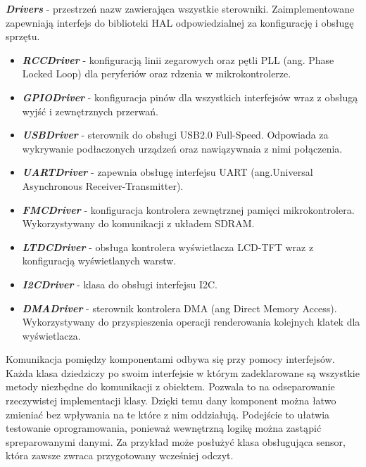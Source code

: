 \documentclass[eng,printmode]{mgr}
\begin{document}
\noindent
\textbf{\textit{Drivers}} - przestrzeń nazw zawierająca wszystkie sterowniki. Zaimplementowane zapewniają interfejs do biblioteki HAL odpowiedzialnej za konfigurację i obsługę sprzętu.
\begin{itemize}[label={}]
  \item \textbf{\textit{RCCDriver}} - konfiguracją linii zegarowych oraz pętli PLL (ang. Phase Locked Loop) dla peryferiów oraz rdzenia w mikrokontrolerze. 
  \item \textbf{\textit{GPIODriver}} - konfiguracja pinów dla wszystkich interfejsów wraz z obsługą wyjść i zewnętrznych przerwań.
  \item \textbf{\textit{USBDriver}} - sterownik do obsługi USB2.0 Full-Speed. Odpowiada za wykrywanie podłaczonych urządzeń oraz nawiązywnaia z nimi połączenia.
  \item \textbf{\textit{UARTDriver}} - zapewnia obsługę interfejsu UART (ang.Universal Asynchronous Receiver-Transmitter).
  \item \textbf{\textit{FMCDriver}} - konfiguracja kontrolera zewnętrznej pamięci mikrokontrolera. Wykorzystywany do komunikacji z układem SDRAM.
  \item \textbf{\textit{LTDCDriver}} - obsługa kontrolera wyświetlacza LCD-TFT wraz z konfiguracją wyświetlanych warstw.  
  \item \textbf{\textit{I2CDriver}} - klasa do obsługi interfejsu I2C.
  \item \textbf{\textit{DMADriver}} - sterownik kontrolera DMA (ang Direct Memory Access). Wykorzystywany do przyspieszenia operacji renderowania kolejnych klatek dla wyświetlacza.
\end{itemize}


Komunikacja pomiędzy komponentami odbywa się przy pomocy interfejsów. Każda klasa dziedziczy po swoim interfejsie w którym zadeklarowane są wszystkie metody niezbędne do komunikacji z obiektem. Pozwala to na odseparowanie rzeczywistej implementacji klasy. Dzięki temu dany komponent można łatwo zmieniać bez wpływania na te które z nim oddziałują. Podejście to ułatwia testowanie oprogramowania, ponieważ wewnętrzną logikę można zastąpić spreparowanymi danymi. Za przykład może posłużyć klasa obsługująca sensor, która zawsze zwraca przygotowany wcześniej odczyt. 
\end{document}
